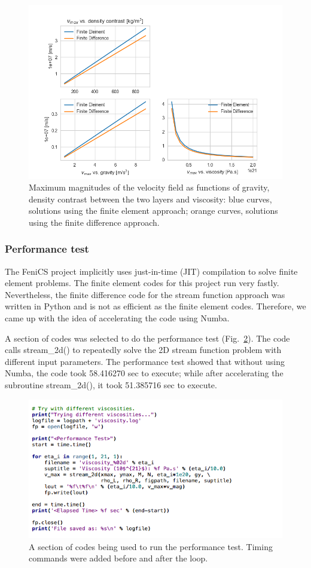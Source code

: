 \documentclass[12pt]{article}
\numberwithin{figure}{section}  %
\numberwithin{equation}{section}  %
\begin{document}
\begin{multicols}{2}
\begin{figure}[!htb]
	\centering
	\includegraphics[width=0.7\linewidth]{../Python/output/fd_solution/log/fe_vs_fd}
	\caption{Maximum magnitudes of the velocity field as functions of gravity, density contrast between the two layers and viscosity: blue curves, solutions using the finite element approach; orange curves, solutions using the finite difference approach.}
	\label{fig:fevsfd}
\end{figure}

\subsubsection{Performance test}

The FeniCS project implicitly uses just-in-time (JIT) compilation to solve finite element problems. The finite element codes for this project run very fastly. Nevertheless, the finite difference code for the stream function approach was written in Python and is not as efficient as the finite element codes. Therefore, we came up with the idea of accelerating the code using Numba.

A section of codes was selected to do the performance test (Fig.\ \ref{fig:performtest}). The code calls \textsf{stream\_2d()} to repeatedly solve the 2D stream function problem with different input parameters. The performance test showed that without using Numba, the code took 58.416270 sec to execute; while after accelerating the subroutine \textsf{stream\_2d()}, it took 51.385716 sec to execute.

\begin{figure}[!htb]
	\centering
	\includegraphics[width=0.7\linewidth]{../Python/report/fd_numba/perform_test}
	\caption{A section of codes being used to run the performance test. Timing commands were added before and after the loop.}
	\label{fig:performtest}
\end{figure}


\end{multicols}
\end{document}
